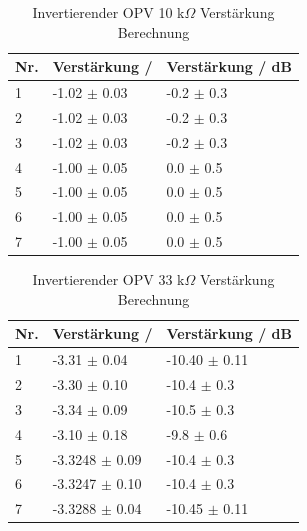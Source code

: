 \documentclass[12pt,a4paper,twoside]{article}
\begin{document}
\begin{table}[H]
    \centering
    \caption{Invertierender OPV 10 k$\Omega$ Verstärkung Berechnung}
    \label{tab:IoVerstärkungenBerechnet10AW}
    \begin{tabular}{| l | l | l |}
        \hline
        Nr. & Verstärkung / & Verstärkung / dB \\
        \hline
        1 & -1.02 $\pm$ 0.03 & -0.2 $\pm$ 0.3 \\
        2 & -1.02 $\pm$ 0.03 & -0.2 $\pm$ 0.3 \\
        3 & -1.02 $\pm$ 0.03 & -0.2 $\pm$ 0.3 \\
        4 & -1.00 $\pm$ 0.05 &  0.0 $\pm$ 0.5 \\
        5 & -1.00 $\pm$ 0.05 &  0.0 $\pm$ 0.5 \\
        6 & -1.00 $\pm$ 0.05 &  0.0 $\pm$ 0.5 \\
        7 & -1.00 $\pm$ 0.05 &  0.0 $\pm$ 0.5 \\
        \hline
    \end{tabular}
\end{table}

\begin{table}[H]
    \centering
    \caption{Invertierender OPV 33 k$\Omega$ Verstärkung Berechnung}
    \label{tab:IoVerstärkungenBerechnet33AW}
    \begin{tabular}{| l | l | l |}
        \hline
        Nr. & Verstärkung / & Verstärkung / dB \\
        \hline
        1 & -3.31 $\pm$ 0.04 & -10.40 $\pm$ 0.11 \\
        2 & -3.30 $\pm$ 0.10 & -10.4 $\pm$ 0.3 \\
        3 & -3.34 $\pm$ 0.09 & -10.5 $\pm$ 0.3 \\
        4 & -3.10 $\pm$ 0.18 & -9.8 $\pm$ 0.6 \\
        5 & -3.3248 $\pm$ 0.09 & -10.4 $\pm$ 0.3 \\
        6 & -3.3247 $\pm$ 0.10 & -10.4 $\pm$ 0.3 \\
        7 & -3.3288 $\pm$ 0.04 & -10.45 $\pm$ 0.11 \\
        \hline
    \end{tabular}
\end{table}
\end{document}
